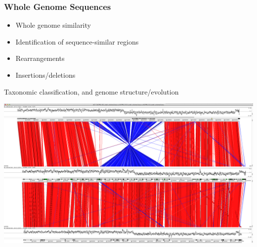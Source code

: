\begin{frame}
  \frametitle{Whole Genome Sequences}
  \begin{itemize}
    \item Whole genome similarity
    \item Identification of sequence-similar regions
    \item Rearrangements
    \item Insertions/deletions
  \end{itemize}    
  Taxonomic classification, and genome structure/evolution
  \begin{center}
    \includegraphics[height=0.4\textheight]{images/act_comparison}
  \end{center}  
\end{frame}

